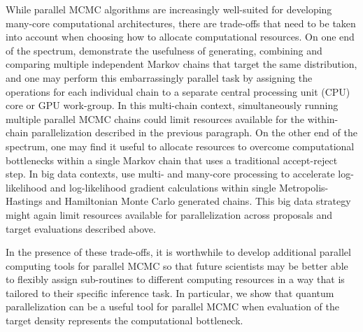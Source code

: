\documentclass[12pt]{article} %
\begin{document}
While parallel MCMC algorithms are increasingly well-suited for developing many-core computational architectures, there are trade-offs that need to be taken into account when choosing how to allocate computational resources.  On one end of the spectrum, \citet{gelman1992inference,gelman1992single} demonstrate the usefulness of generating, combining and comparing multiple independent Markov chains that target the same distribution, and one may perform this embarrassingly parallel task by assigning the operations for each individual chain to a separate central processing unit (CPU) core or GPU work-group.  In this multi-chain context, simultaneously running multiple parallel MCMC chains could limit resources available for the within-chain parallelization described in the previous paragraph.  On the other end of the spectrum, one may find it useful to allocate resources to overcome computational bottlenecks within a single Markov chain that uses a traditional accept-reject step. In big data contexts, \citet{massive,holbrook2021scalable,holbrook2022bayesian,holbrook2022viral} use multi- and many-core processing to accelerate log-likelihood and log-likelihood gradient calculations within single Metropolis-Hastings and Hamiltonian Monte Carlo \citep{neal2011mcmc} generated chains.  This big data strategy might again limit resources available for parallelization across proposals and target evaluations described above.

In the presence of these trade-offs, it is worthwhile to develop additional parallel computing tools for parallel MCMC so that future scientists may be better able to flexibly assign sub-routines to different computing resources in a way that is tailored to their specific inference task.  In particular, we show that quantum parallelization can be a useful tool for parallel MCMC when evaluation of the target density represents the computational bottleneck.
\end{document}

